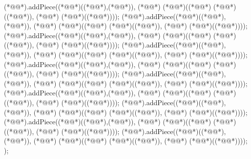 \begin{vdm_al}
    (*@@*).addPiece((*@@*)((*@@*),(*@@*)), (*@@*) (*@@*)((*@@*) (*@@*)((*@@*)), (*@@*) (*@@*)((*@@*))));
    (*@@*).addPiece((*@@*)((*@@*),(*@@*)), (*@@*) (*@@*)((*@@*) (*@@*)((*@@*)), (*@@*) (*@@*)((*@@*))));
    (*@@*).addPiece((*@@*)((*@@*),(*@@*)), (*@@*) (*@@*)((*@@*) (*@@*)((*@@*)), (*@@*) (*@@*)((*@@*))));
    (*@@*).addPiece((*@@*)((*@@*),(*@@*)), (*@@*) (*@@*)((*@@*) (*@@*)((*@@*)), (*@@*) (*@@*)((*@@*))));
    (*@@*).addPiece((*@@*)((*@@*),(*@@*)), (*@@*) (*@@*)((*@@*) (*@@*)((*@@*)), (*@@*) (*@@*)((*@@*))));
    (*@@*).addPiece((*@@*)((*@@*),(*@@*)), (*@@*) (*@@*)((*@@*) (*@@*)((*@@*)), (*@@*) (*@@*)((*@@*))));
    (*@@*).addPiece((*@@*)((*@@*),(*@@*)), (*@@*) (*@@*)((*@@*) (*@@*)((*@@*)), (*@@*) (*@@*)((*@@*))));
    (*@@*).addPiece((*@@*)((*@@*),(*@@*)), (*@@*) (*@@*)((*@@*) (*@@*)((*@@*)), (*@@*) (*@@*)((*@@*))));
    (*@@*).addPiece((*@@*)((*@@*),(*@@*)), (*@@*) (*@@*)((*@@*) (*@@*)((*@@*)), (*@@*) (*@@*)((*@@*))));
    (*@@*).addPiece((*@@*)((*@@*),(*@@*)), (*@@*) (*@@*)((*@@*) (*@@*)((*@@*)), (*@@*) (*@@*)((*@@*))));
   );
  

\end{vdm_al}
